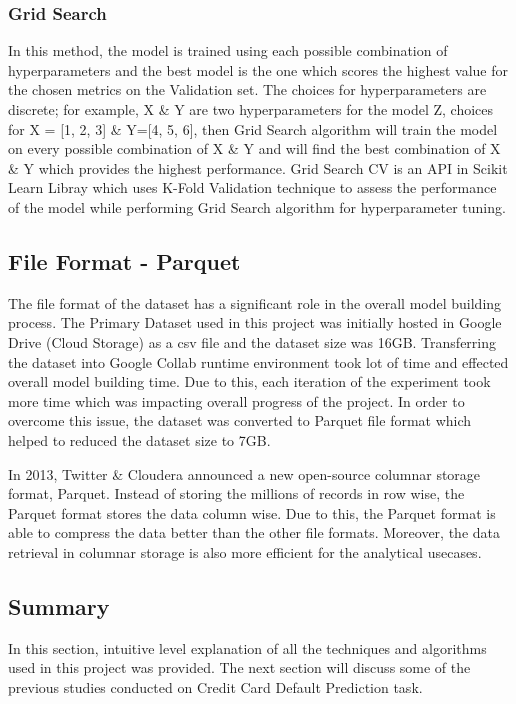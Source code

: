 \documentclass[twoside,11pt,a4paper]{article}
\begin{document}
\subsubsection{Grid Search} \label{sec:grid_search}
In this method, the model is trained using each possible combination of hyperparameters and the best model is the one which scores the highest value for the chosen metrics on the Validation set. The choices for hyperparameters are discrete; for example, X \& Y  are two hyperparameters for the model Z, choices for X = [1, 2, 3] \& Y=[4, 5, 6], then Grid Search algorithm will train the model on every possible combination of X \& Y and will find the best combination of X \& Y which provides the highest performance. Grid Search \acs{CV} is an API in Scikit Learn Libray which uses K-Fold Validation technique to assess the performance of the model while performing Grid Search algorithm for hyperparameter tuning.

\subsection{File Format - Parquet}
The file format of the dataset has a significant role in the overall model building process. The Primary Dataset used in this project was initially hosted in Google Drive (Cloud Storage) as a csv file and the dataset size was 16GB. Transferring the dataset into Google Collab runtime environment took lot of time and effected overall model building time. Due to this, each iteration  of the experiment took more time which was impacting overall progress of the project. In order to overcome this issue, the dataset was converted to Parquet  file format which helped to reduced the dataset size to 7GB.

In 2013, Twitter \& Cloudera announced a new open-source columnar storage format, Parquet. Instead of storing the millions of records in row wise, the Parquet format stores the data column wise. Due to this, the Parquet format is able to compress the data better than the other file formats. Moreover, the data retrieval in columnar storage is also more efficient for the analytical usecases. 


\subsection{Summary}
In this section, intuitive level explanation of all the techniques and algorithms used in this project was provided. The next section will discuss some of the previous studies conducted on Credit Card Default Prediction task.
\vfill
\clearpage
\end{document}
